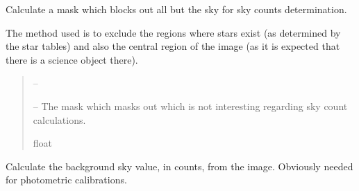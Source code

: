\documentclass[letterpaper,11pt,english]{sphinxmanual}
\begin{document}
\begin{savenotes}
\begin{fulllineitems}
\begin{savenotes}\begin{fulllineitems}
\label{\detokenize{code/opihiexarata.photometry.solution:opihiexarata.photometry.solution.PhotometricSolution.__calculate_sky_counts_mask}}
\pysigstartsignatures
{}
\pysigstopsignatures
\sphinxAtStartPar
Calculate a mask which blocks out all but the sky for sky counts
determination.

\sphinxAtStartPar
The method used is to exclude the regions where stars exist (as
determined by the star tables) and also the central region
of the image (as it is expected that there is a science object there).
\begin{quote}\begin{description}
\sphinxAtStartPar
{} – 

\sphinxAtStartPar
{} – The mask which masks out which is not interesting regarding sky
count calculations.

\sphinxAtStartPar
float

\end{description}\end{quote}

\end{fulllineitems}\end{savenotes}


\begin{savenotes}\begin{fulllineitems}
\label{\detokenize{code/opihiexarata.photometry.solution:opihiexarata.photometry.solution.PhotometricSolution.__calculate_sky_counts_value}}
\pysigstartsignatures
{}
\pysigstopsignatures
\sphinxAtStartPar
Calculate the background sky value, in counts, from the image.
Obviously needed for photometric calibrations.


\end{fulllineitems}
\end{savenotes}
\end{fulllineitems}
\end{savenotes}
\end{document}

